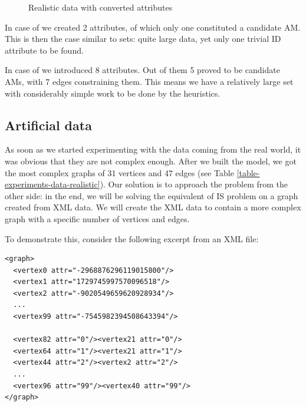 \begin{figure}
  \caption{Realistic data with converted attributes}
  \label{image-experiments-data-converted}
  \centering
\end{figure}

In case of  we created 2 attributes, of which only one constituted a candidate AM. This is then the case similar to  sets: quite large data, yet only one trivial ID attribute to be found.

In case of  we introduced 8 attributes. Out of them 5 proved to be candidate AMs, with 7 edges constraining them. This means we have a relatively large set with considerably simple work to be done by the heuristics.

\subsection{Artificial data}

As soon as we started experimenting with the data coming from the real world, it was obvious that they are not complex enough. After we built the model, we got the most complex graphs of 31 vertices and 47 edges (see Table \ref{table-experiments-data-realistic}). Our solution is to approach the problem from the other side: in the end, we will be solving the equivalent of IS problem on a graph created from XML data. We will create the XML data to contain a more complex graph with a specific number of vertices and edges.

To demonstrate this, consider the following excerpt from an XML file:

\begin{scriptsize}
\begin{verbatim}
<graph>
  <vertex0 attr="-2968876296119015800"/>
  <vertex1 attr="1729745997570096518"/>
  <vertex2 attr="-9020549659620928934"/>
  ...
  <vertex99 attr="-7545982394508643394"/>

  <vertex82 attr="0"/><vertex21 attr="0"/>
  <vertex64 attr="1"/><vertex21 attr="1"/>
  <vertex44 attr="2"/><vertex2 attr="2"/>
  ...
  <vertex96 attr="99"/><vertex40 attr="99"/>
</graph>
\end{verbatim}
\end{scriptsize}

